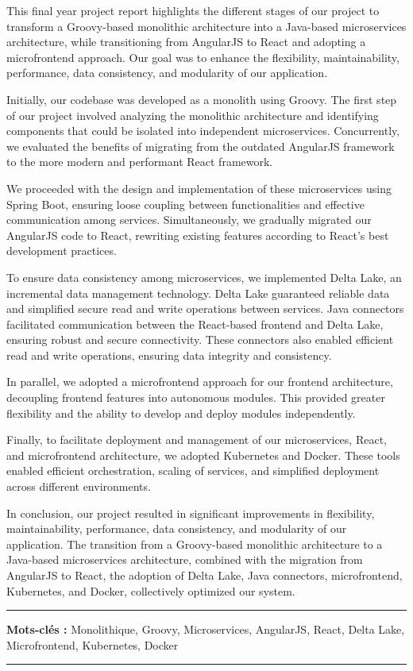 \resumeAn
This final year project report highlights the different stages of our project to transform a Groovy-based monolithic architecture into a Java-based microservices architecture, while transitioning from AngularJS to React and adopting a microfrontend approach. Our goal was to enhance the flexibility, maintainability, performance, data consistency, and modularity of our application.
\medskip

Initially, our codebase was developed as a monolith using Groovy. The first step of our project involved analyzing the monolithic architecture and identifying components that could be isolated into independent microservices. Concurrently, we evaluated the benefits of migrating from the outdated AngularJS framework to the more modern and performant React framework.

\medskip
We proceeded with the design and implementation of these microservices using Spring Boot, ensuring loose coupling between functionalities and effective communication among services. Simultaneously, we gradually migrated our AngularJS code to React, rewriting existing features according to React's best development practices.  
\medskip

To ensure data consistency among microservices, we implemented Delta Lake, an incremental data management technology. Delta Lake guaranteed reliable data and simplified secure read and write operations between services. Java connectors facilitated communication between the React-based frontend and Delta Lake, ensuring robust and secure connectivity. These connectors also enabled efficient read and write operations, ensuring data integrity and consistency.

\medskip
In parallel, we adopted a microfrontend approach for our frontend architecture, decoupling frontend features into autonomous modules. This provided greater flexibility and the ability to develop and deploy modules independently.

\medskip

Finally, to facilitate deployment and management of our microservices, React, and microfrontend architecture, we adopted Kubernetes and Docker. These tools enabled efficient orchestration, scaling of services, and simplified deployment across different environments.
\medskip

In conclusion, our project resulted in significant improvements in flexibility, maintainability, performance, data consistency, and modularity of our application. The transition from a Groovy-based monolithic architecture to a Java-based microservices architecture, combined with the migration from AngularJS to React, the adoption of Delta Lake, Java connectors, microfrontend, Kubernetes, and Docker, collectively optimized our system.

    \noindent\rule[2pt]{\textwidth}{0.5pt}
    {\textbf{Mots-clés :}}
    Monolithique, Groovy, Microservices, AngularJS, React, Delta Lake, Microfrontend, Kubernetes, Docker\\
    \noindent\rule[2pt]{\textwidth}{0.5pt}
\clearpage